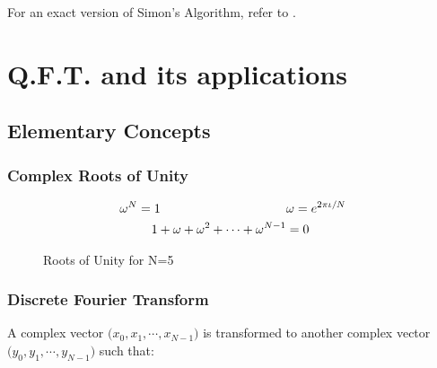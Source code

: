 \documentclass[11.5pt, paper=a4]{article}
\theoremstyle{definition}
\numberwithin{theorem}{section}
\begin{document}
For an exact version of Simon's Algorithm, refer to \citet{1}.

\section{Q.F.T. and its applications}

\subsection{Elementary Concepts}

\subsubsection{Complex Roots of Unity}

\begin{align*}
    \omega^N = 1  \hspace{100px}                  & \omega = e^{{2\pi\iota}/{N}} \\
    1 + \omega + \omega^2 + \cdots + \omega^{N-1} & = 0
\end{align*}



\begin{figure}[ht]
    \def\n{5}
    \centering
    \caption{Roots of Unity for N=5} \label{fig:2}
\end{figure}


\subsubsection{Discrete Fourier Transform}

A complex vector $\big(x_0, x_1, \cdots, x_{N-1} \big)$ is transformed to another complex vector
$\big( y_0, y_1, \cdots, y_{N-1} \big)$ such that:
\end{document}
